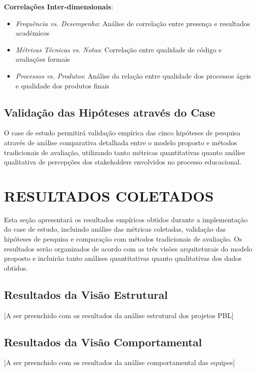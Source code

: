\documentclass[12pt,a4paper]{article}
\begin{document}
\textbf{Correlações Inter-dimensionais}:
\begin{itemize}
\item \textit{Frequência vs. Desempenho}: Análise de correlação entre presença e resultados académicos
\item \textit{Métricas Técnicas vs. Notas}: Correlação entre qualidade de código e avaliações formais
\item \textit{Processos vs. Produtos}: Análise da relação entre qualidade dos processos ágeis e qualidade dos produtos finais
\end{itemize}

\subsection{Validação das Hipóteses através do Case}

O case de estudo permitirá validação empírica das cinco hipóteses de pesquisa através de análise comparativa detalhada entre o modelo proposto e métodos tradicionais de avaliação, utilizando tanto métricas quantitativas quanto análise qualitativa de percepções dos stakeholders envolvidos no processo educacional.

\section{RESULTADOS COLETADOS}

Esta seção apresentará os resultados empíricos obtidos durante a implementação do case de estudo, incluindo análise das métricas coletadas, validação das hipóteses de pesquisa e comparação com métodos tradicionais de avaliação. Os resultados serão organizados de acordo com as três visões arquiteturais do modelo proposto e incluirão tanto análises quantitativas quanto qualitativas dos dados obtidos.

\subsection{Resultados da Visão Estrutural}

[A ser preenchido com os resultados da análise estrutural dos projetos PBL]

\subsection{Resultados da Visão Comportamental}

[A ser preenchido com os resultados da análise comportamental das equipes]
\end{document}
